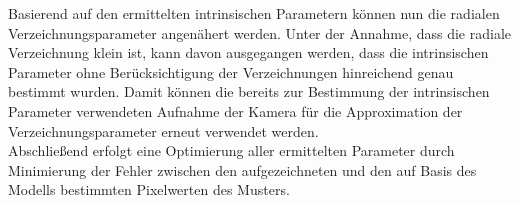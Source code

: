 
Basierend auf den ermittelten intrinsischen Parametern können nun die radialen Verzeichnungsparameter angenähert werden. Unter der Annahme, dass die radiale Verzeichnung klein ist, kann davon ausgegangen werden, dass die intrinsischen Parameter ohne Berücksichtigung der Verzeichnungen hinreichend genau bestimmt wurden. Damit können die bereits zur Bestimmung der intrinsischen Parameter verwendeten Aufnahme der Kamera für die Approximation der Verzeichnungsparameter erneut verwendet werden.\\

Abschließend erfolgt eine Optimierung aller ermittelten Parameter durch Minimierung der Fehler zwischen den aufgezeichneten und den auf Basis des Modells bestimmten Pixelwerten des Musters.\\




